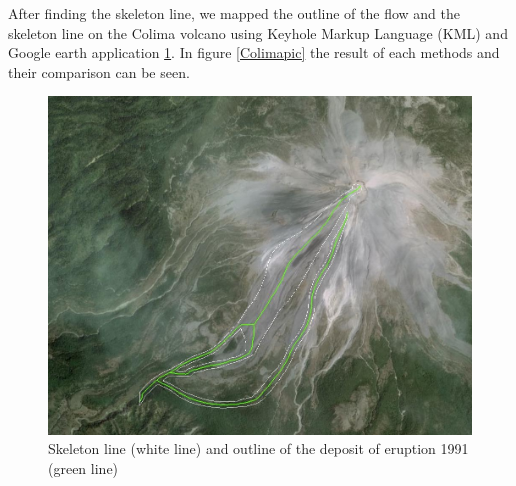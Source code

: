 \documentclass[letterpaper,10pt]{article}
\begin{document}

After finding the skeleton line, we mapped the outline of the flow and the skeleton line on the Colima volcano 
using Keyhole Markup Language (KML) and Google earth application \ref{skel_outline}. In figure \ref{Colimapic} the result of each methods and their comparison can be seen. 

\begin{figure}[H]
\centerline{\includegraphics[width=.35\textwidth]{IMAGES/skeleton_outline1.jpg}}
\caption{Skeleton line (white line) and outline of the deposit of eruption 1991 (green line)}
\label{skel_outline}
\end{figure}
\end{document}

